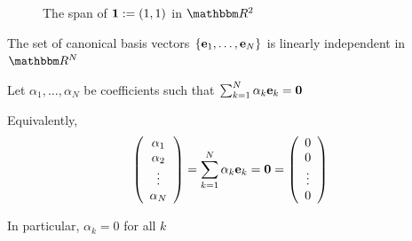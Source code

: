 \begin{frame}

    \vspace{2em}
    \begin{figure}
       \centering
        \caption{The span of ${\mathbf 1} := (1,1)$ in $\RR^2$}
    \end{figure}

\end{frame}

\begin{frame}
    
    \vspace{2em}
    \Eg
    The set of canonical basis vectors $\{{\mathbf e}_1, \ldots, {\mathbf e}_N\}$
    is linearly independent in $\RR^N$
    
    \Prf Let $\alpha_1, \ldots, \alpha_N$ be coefficients such that
    $\sum_{k=1}^N \alpha_k {\mathbf e}_k = {\mathbf 0}$

    Equivalently,
    \begin{equation*}
        \left(
        \begin{array}{c}
            \alpha_1 \\
            \alpha_2 \\
            \vdots \\
            \alpha_N
        \end{array}
        \right)
        = \sum_{k=1}^N \alpha_k {\mathbf e}_k 
        = {\mathbf 0}
        =
        \left(
        \begin{array}{c}
            0 \\
            0 \\
            \vdots \\
            0
        \end{array}
        \right)
    \end{equation*}

    \vspace{1em}

    In particular, $\alpha_k = 0$ for all $k$
    
\end{frame}




